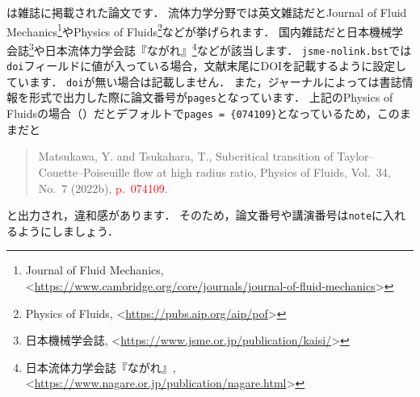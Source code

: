 \documentclass[a4paper,fleqn,uplatex,dvipdfmx]{jsarticle}
\newcommand{\jsmefile}{\texttt{jsme-nolink.bst}}
\begin{document}
\ttarticle は雑誌に掲載された論文です．
流体力学分野では英文雑誌だとJournal of Fluid Mechanics\footnote{Journal of Fluid Mechanics, \textless\url{https://www.cambridge.org/core/journals/journal-of-fluid-mechanics}\textgreater}やPhysics of Fluids\footnote{Physics of Fluids, \textless\url{https://pubs.aip.org/aip/pof}\textgreater}などが挙げられます．
国内雑誌だと日本機械学会誌\footnote{日本機械学会誌, \textless\url{https://www.jsme.or.jp/publication/kaisi/}\textgreater}や日本流体力学会誌『ながれ』\footnote{日本流体力学会誌『ながれ』, \textless\url{https://www.nagare.or.jp/publication/nagare.html}\textgreater}などが該当します．
\jsmefile では\verb|doi|フィールドに値が入っている場合，文献末尾にDOIを記載するように設定しています．
\verb|doi|が無い場合は記載しません．
また，ジャーナルによっては書誌情報を\BibTeX{}形式で出力した際に論文番号が\verb|pages|となっています．
上記のPhysics of Fluidsの場合（\citealp{Matsukawa:PoF2022}）だとデフォルトで\verb|pages = {074109}|となっているため，このままだと
\begin{quote}
    Matsukawa, Y. and Tsukahara, T., Subcritical transition of Taylor--Couette--Poiseuille flow at high radius ratio, Physics of Fluids, Vol.~34, No.~7 (2022b), \textcolor{red}{p.~074109}.
\end{quote}
と出力され，違和感があります．
そのため，論文番号や講演番号は\verb|note|に入れるようにしましょう．
\end{document}
